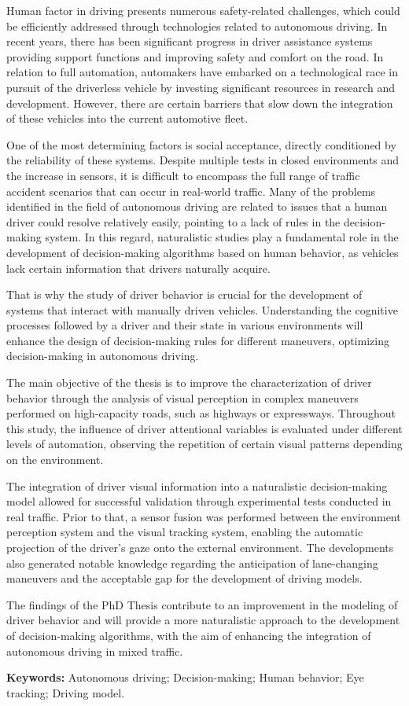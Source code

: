 Human factor in driving presents numerous safety-related challenges, which could be efficiently addressed through technologies related to autonomous driving. In recent years, there has been significant progress in driver assistance systems providing support functions and improving safety and comfort on the road. In relation to full automation, automakers have embarked on a technological race in pursuit of the driverless vehicle by investing significant resources in research and development. However, there are certain barriers that slow down the integration of these vehicles into the current automotive fleet.

One of the most determining factors is social acceptance, directly conditioned by the reliability of these systems. Despite multiple tests in closed environments and the increase in sensors, it is difficult to encompass the full range of traffic accident scenarios that can occur in real-world traffic. Many of the problems identified in the field of autonomous driving are related to issues that a human driver could resolve relatively easily, pointing to a lack of rules in the decision-making system. In this regard, naturalistic studies play a fundamental role in the development of decision-making algorithms based on human behavior, as vehicles lack certain information that drivers naturally acquire.

That is why the study of driver behavior is crucial for the development of systems that interact with manually driven vehicles. Understanding the cognitive processes followed by a driver and their state in various environments will enhance the design of decision-making rules for different maneuvers, optimizing decision-making in autonomous driving.

The main objective of the thesis is to improve the characterization of driver behavior through the analysis of visual perception in complex maneuvers performed on high-capacity roads, such as highways or expressways. Throughout this study, the influence of driver attentional variables is evaluated under different levels of automation, observing the repetition of certain visual patterns depending on the environment.

The integration of driver visual information into a naturalistic decision-making model allowed for successful validation through experimental tests conducted in real traffic. Prior to that, a sensor fusion was performed between the environment perception system and the visual tracking system, enabling the automatic projection of the driver's gaze onto the external environment. The developments also generated notable knowledge regarding the anticipation of lane-changing maneuvers and the acceptable gap for the development of driving models.

The findings of the PhD Thesis contribute to an improvement in the modeling of driver behavior and will provide a more naturalistic approach to the development of decision-making algorithms, with the aim of enhancing the integration of autonomous driving in mixed traffic.

\vspace{10pt}
\textbf{Keywords:} Autonomous driving; Decision-making; Human behavior; Eye tracking; Driving model.
